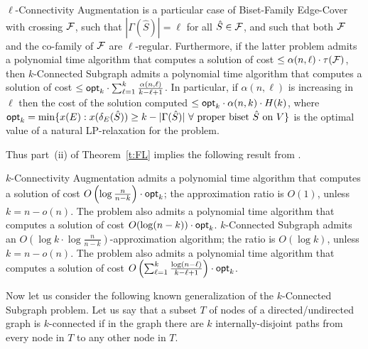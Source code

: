 \begin{proposition} \label{p:RW}
{\sf $\ell$-Connectivity Augmentation} is a particular case of {\sf Biset-Family Edge-Cover} with crossing 
${\cal F}$, such that $|\Gamma(\hat{S})|=\ell$ for all $\hat{S} \in {\cal F}$, 
and such that both ${\cal F}$ and the co-family of ${\cal F}$ are $\ell$-regular.
Furthermore, if the latter problem admits a polynomial time algorithm that computes a solution
of cost $\leq \alpha(n,\ell) \cdot \tau({\cal F})$, then {\sf $k$-Connected Subgraph}
admits a polynomial time algorithm that computes a solution 
of cost $\leq {\sf opt}_k \cdot \sum_{\ell=1}^k \frac{\alpha(n,\ell)}{k-\ell+1}$.
In particular, if $\alpha(n,\ell)$ is increasing in $\ell$ then the cost of the solution
computed $\leq {\sf opt}_k \cdot \alpha(n,k) \cdot H(k)$, where 
${\sf opt}_k=\min\{x(E): 
  x(\delta_E(\hat{S})) \geq k-|\Gamma(\hat{S})| \ \forall \mbox{ proper biset } \hat{S} \mbox{ on } V\}$
is the optimal value of a natural LP-relaxation for the problem.
\end{proposition}

Thus part~(ii) of Theorem~\ref{t:FL} implies the following result from \cite{N}.

\begin{corollary} [\cite{N}] \label{c:aug}
{\sf $k$-Connectivity Augmentation} admits a polynomial time algorithm 
that computes a solution of cost 
$O\left(\log \frac{n}{n-k} \right) \cdot {\sf opt}_k$;
the approximation ratio is $O(1)$, unless $k=n-o(n)$.
The problem also admits a polynomial time algorithm that computes a solution of cost
$O(\log(n-k))\cdot {\sf opt}_k$.
{\sf $k$-Connected Subgraph} admits an 
$O\left(\log k \cdot \log \frac{n}{n-k} \right)$-approximation algorithm;
the ratio is $O(\log k)$, unless $k=n-o(n)$.
The problem also admits a polynomial time algorithm that computes a solution of cost
$O\left(\sum_{\ell=1}^k \frac{\log (n-\ell)}{k-\ell+1}\right) \cdot {\sf opt}_k$.
\end{corollary}

Now let us consider the following known generalization of the {\sf $k$-Connected Subgraph} problem.
Let us say that a subset $T$ of nodes of a directed/undirected graph is $k$-connected if in the graph 
there are $k$ internally-disjoint paths from every node in $T$ to any other node in $T$.

\vspace{0.1cm}

\begin{center} 
\end{center}

